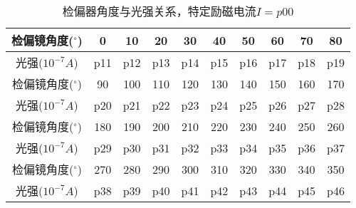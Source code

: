     \begin{table}[H]
      \centering
      \begin{tabular}{|c|c|c|c|c|c|c|c|c|c|}
        \hline
        检偏镜角度(${}^{\circ}$) & 0 & 10 & 20 & 30 & 40 & 50 & 60 & 70 & 80 \\\hline
        光强($10^{-7} \si{A}$)  & p11 & p12 & p13 & p14 & p15 & p16 & p17 & p18 & p19 \\\hline
        检偏镜角度(${}^{\circ}$) & 90 & 100 & 110 & 120 & 130 & 140 & 150 & 160 & 170 \\\hline
        光强($10^{-7} \si{A}$)  & p20 & p21 & p22 & p23 & p24 & p25 & p26 & p27 & p28  \\\hline
        检偏镜角度(${}^{\circ}$) & 180 & 190 & 200 & 210 & 220 & 230 & 240 & 250 & 260  \\\hline
        光强($10^{-7} \si{A}$)  & p29 & p30 & p31 & p32 & p33 & p34 & p35 & p36 & p37 \\\hline
        检偏镜角度(${}^{\circ}$) & 270 & 280 & 290 & 300 & 310 & 320 & 330 & 340 & 350 \\\hline
        光强($10^{-7} \si{A}$)  & p38 & p39 & p40 & p41 & p42 & p43 & p44 & p45 & p46 \\\hline
      \end{tabular}
      \caption{检偏器角度与光强关系，特定励磁电流$I=p00$}
    \end{table}
